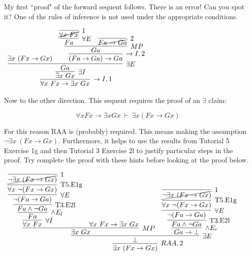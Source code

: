 \documentclass[11pt]{report}
\begin{document}
\begin{enumerate}
\begin{enumerate}
			My first ``proof" of the forward sequent follows. There is an error! Can you spot it? One of the rules of inference is not used under the appropriate conditions. 

				\begin{mdframed}
					\begin{center}
						$\begin{array}{c}
							\infer[\to I,1]{\forall x \ Fx \to \exists x \ Gx}
								{\infer[\exists I]{\exists x \ Gx}
									{\infer[\exists E]{Ga}
										{\exists x \ (Fx \to Gx)
										&
										\infer[\to I,2]{(Fa \to Ga) \to Ga}
											{\infer[MP]{Ga}
												{\infer[\forall E]{Fa}
													{\infer[1]{\cancel{\forall x \ Fx}}{}}
												&
												\infer[2]{\cancel{Fa \to Ga}}{}
												}}}}}
						\end{array}$
					\end{center}
				\end{mdframed}

			Now to the other direction. This sequent requires the proof of an $\exists$ claim: 
			
			$$\forall x Fx \to \exists x Gx \ \vdash \ \exists x (Fx \to Gx)$$

			For this reason RAA is (probably) required. This means making the assumption $\lnot \exists x \ (Fx \to Gx)$. Furthermore, it helps to use the results from Tutorial 5 Exercise 1g and then Tutorial 3 Exercise 2l to justify particular steps in the proof. Try complete the proof with these hints before looking at the proof below. 

				\begin{mdframed}
					\begin{center}
						$\begin{array}{c}
							\infer[RAA,2]{\exists x \ (Fx \to Gx)}
								{\infer[\exists E]{\bot}
									{\infer[MP]{\exists x \ Gx}
										{\infer[\forall I]{\forall x \ Fx}
											{\infer[\land E_{l}]{Fa}
												{\infer[\text{T3.E2l}]{Fa \land \lnot Ga}
													{\infer[\forall E]{\lnot(Fa \to Ga)}
														{\infer[\text{T5.E1g}]{\forall x \ \lnot(Fx \to Gx)}
															{\infer[1]{\cancel{\lnot \exists x \ (Fx \to Gx)}}
																{}}}}}}
										&
										\forall x \ Fx \to \exists x \ Gx}
									&
									\infer[\land E_{r}]{Ga \to \bot}
										{\infer[\text{T3.E2l}]{Fa \land \lnot Ga}
											{\infer[\forall E]{\lnot(Fa \to Ga)}
												{\infer[\text{T5.E1g}]{\forall x \ \lnot(Fx \to Gx)}
													{\infer[1]{\cancel{\lnot \exists x \ (Fx \to Gx)}}
														{}}}}}}}
						\end{array}$
					\end{center}
				\end{mdframed}


\end{enumerate}
\end{enumerate}
\end{document}
